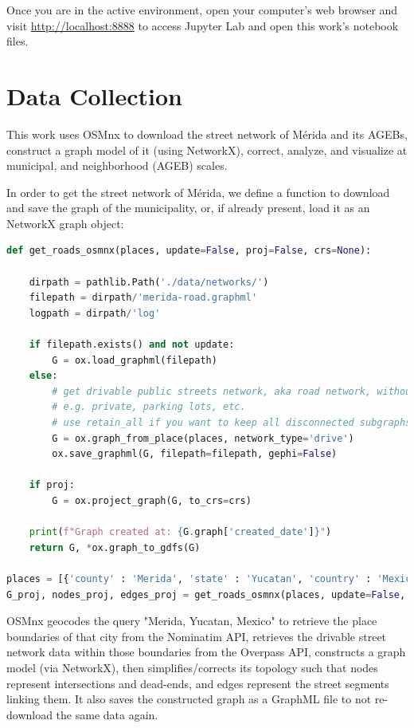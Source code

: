 Once you are in the active environment, open your computer's web browser and visit \url{http://localhost:8888} to access Jupyter Lab and open this work's notebook files.

\section{Data Collection}

This work uses OSMnx to download the street network of Mérida and its AGEBs, construct a graph model of it (using NetworkX), correct, analyze, and visualize at municipal, and neighborhood (AGEB) scales. 

In order to get the street network of Mérida, we define a function to download and save the graph of the municipality, or, if already present, load it as an NetworkX graph object:

\begin{lstlisting}[language=Python]
def get_roads_osmnx(places, update=False, proj=False, crs=None):

	dirpath = pathlib.Path('./data/networks/')
	filepath = dirpath/'merida-road.graphml'
	logpath = dirpath/'log'

	if filepath.exists() and not update:
		G = ox.load_graphml(filepath)
	else:
		# get drivable public streets network, aka road network, without service roads,
		# e.g. private, parking lots, etc.
		# use retain_all if you want to keep all disconnected subgraphs (e.g. when your places aren't adjacent)
		G = ox.graph_from_place(places, network_type='drive')
		ox.save_graphml(G, filepath=filepath, gephi=False)
	
	if proj:
		G = ox.project_graph(G, to_crs=crs)
	
	print(f"Graph created at: {G.graph['created_date']}")
	return G, *ox.graph_to_gdfs(G)
	
places = [{'county' : 'Merida', 'state' : 'Yucatan', 'country' : 'Mexico'}]
G_proj, nodes_proj, edges_proj = get_roads_osmnx(places, update=False, proj=True, crs=3857)
\end{lstlisting}

OSMnx geocodes the query "Merida, Yucatan, Mexico" to retrieve the place boundaries of that city from the Nominatim API, retrieves the drivable street network data within those boundaries from the Overpass API, constructs a graph model (via NetworkX), then simplifies/corrects its topology such that nodes represent intersections and dead-ends, and edges represent the street segments linking them. It also saves the constructed graph as a GraphML file to not re-download the same data again.

